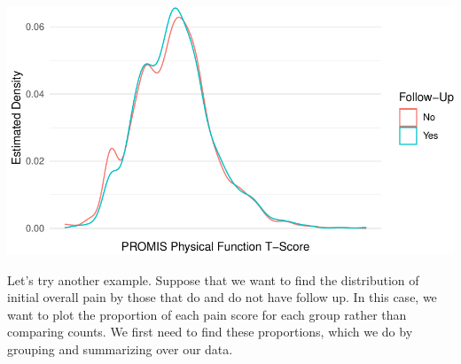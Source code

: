\documentclass[
  letterpaper,
]{krantz}
\makeatletter
\newenvironment{Shaded}{\begin{snugshade}}{\end{snugshade}}
\newcommand{\AttributeTok}[1]{\textcolor[rgb]{0.40,0.45,0.13}{#1}}
\newcommand{\DecValTok}[1]{\textcolor[rgb]{0.68,0.00,0.00}{#1}}
\newcommand{\FunctionTok}[1]{\textcolor[rgb]{0.28,0.35,0.67}{#1}}
\newcommand{\NormalTok}[1]{\textcolor[rgb]{0.00,0.23,0.31}{#1}}
\newcommand{\OtherTok}[1]{\textcolor[rgb]{0.00,0.23,0.31}{#1}}
\newcommand{\SpecialCharTok}[1]{\textcolor[rgb]{0.37,0.37,0.37}{#1}}
\newcommand{\StringTok}[1]{\textcolor[rgb]{0.13,0.47,0.30}{#1}}
\newenvironment{kframe}{%
\medskip{}
\setlength{\fboxsep}{.8em}
 \def\at@end@of@kframe{}%
 \ifinner\ifhmode%
  \def\at@end@of@kframe{\end{minipage}}%
  \begin{minipage}{\columnwidth}%
 \fi\fi%
 \def\FrameCommand##1{\hskip\@totalleftmargin \hskip-\fboxsep
 \colorbox{shadecolor}{##1}\hskip-\fboxsep
     \hskip-\linewidth \hskip-\@totalleftmargin \hskip\columnwidth}%
 \MakeFramed {\advance\hsize-\width
   \@totalleftmargin\z@ \linewidth\hsize
   \@setminipage}}%
 {\par\unskip\endMakeFramed%
 \at@end@of@kframe}
\renewenvironment{Shaded}{\begin{kframe}}{\end{kframe}}
\makeatother
\begin{document}
\begin{Shaded}
\end{Shaded}

\begin{center}
\includegraphics[width=1\textwidth,height=\textheight]{book/visualization_ggplot_files/figure-pdf/unnamed-chunk-16-1.pdf}
\end{center}

Let's try another example. Suppose that we want to find the distribution
of initial overall pain by those that do and do not have follow up. In
this case, we want to plot the proportion of each pain score for each
group rather than comparing counts. We first need to find these
proportions, which we do by grouping and summarizing over our data.
\end{document}
